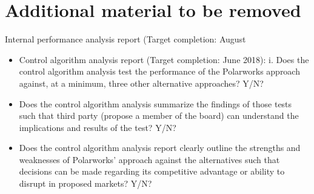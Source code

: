 \documentclass{article}
\begin{document}
\section*{Additional material to be removed}

Internal performance analysis report (Target completion: August 
\begin{itemize}
\item Control algorithm analysis report (Target completion: June 2018):
i. Does the control algorithm analysis test the performance of the
Polarworks approach against, at a minimum, three other alternative
approaches? Y/N?
\item 
Does the control algorithm analysis summarize the findings of those tests
such that third party (propose a member of the board) can understand
the implications and results of the test? Y/N?
\item Does the control algorithm analysis report clearly outline the
strengths and weaknesses of Polarworks’ approach against the
alternatives such that decisions can be made regarding its competitive
advantage or ability to disrupt in proposed markets? Y/N?

\end{itemize}
\end{document}
